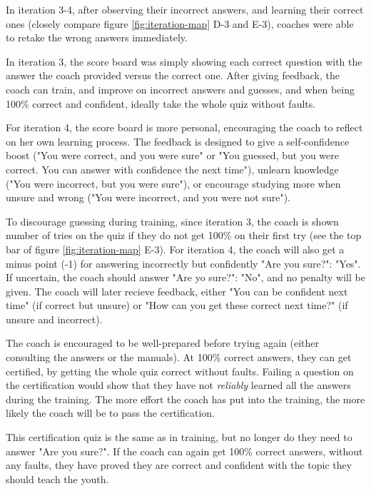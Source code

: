   In iteration 3-4, after observing their incorrect answers, and learning their correct ones (closely compare figure \ref{fig:iteration-map} D-3 and E-3), coaches were able to retake the wrong answers immediately.

  In iteration 3, the score board was simply showing each correct question with the answer the coach provided versus the correct one. After giving feedback, the coach can train, and improve on incorrect answers and guesses, and when being 100\% correct and confident, ideally take the whole quiz without faults.

  For iteration 4, the score board is more personal, encouraging the coach to reflect on her own learning process. The feedback is designed to give a self-confidence boost ("You were correct, and you were sure" or "You guessed, but you were correct. You can answer with confidence the next time"), unlearn knowledge ("You were incorrect, but you were sure"), or encourage studying more when unsure and wrong ("You were incorrect, and you were not sure").

  To discourage guessing during training, since iteration 3, the coach is shown number of tries on the quiz if they do not get 100\% on their first try (see the top bar of figure \ref{fig:iteration-map} E-3). For iteration 4, the coach will also get a minus point (-1) for answering incorrectly but confidently "Are you sure?": "Yes". If uncertain, the coach should answer "Are yo sure?": "No", and no penalty will be given. The coach will later recieve feedback, either "You can be confident next time" (if correct but unsure) or "How can you get these correct next time?" (if unsure and incorrect).

  The coach is encouraged to be well-prepared before trying again (either consulting the answers or the manuals). At 100\% correct answers, they can get certified, by getting the whole quiz correct without faults. Failing a question on the certification would show that they have not \textit{reliably} learned all the answers during the training. The more effort the coach has put into the training, the more likely the coach will be to pass the certification.


   This certification quiz is the same as in training, but no longer do they need to answer "Are you sure?". If the coach can again get 100\% correct answers, without any faults, they have proved they are correct and confident with the topic they should teach the youth.

